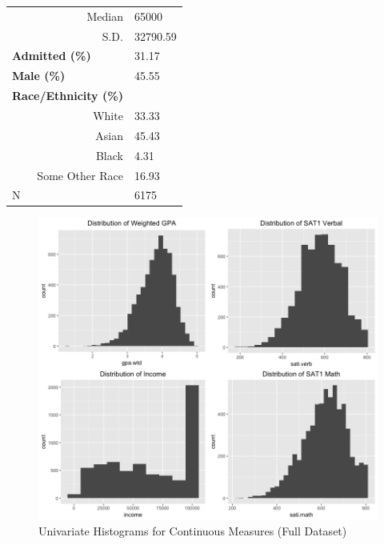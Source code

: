 \documentclass[titlepage]{article}   	%
\begin{document}
\begin{table}[]
\begin{tabular}{@{}rl@{}}
Median                                           & 65000    \\
S.D.                                             & 32790.59 \\
\multicolumn{1}{l}{\textbf{Admitted (\%)}}       & 31.17    \\
\multicolumn{1}{l}{\textbf{Male (\%)}}           & 45.55    \\
\multicolumn{1}{l}{\textbf{Race/Ethnicity (\%)}} &          \\
White                                            & 33.33    \\
Asian                                            & 45.43    \\
Black                                            & 4.31     \\
Some Other Race                                  & 16.93    \\
\multicolumn{1}{l}{N}                            & 6175     \\ \bottomrule
\end{tabular}
\end{table}

\begin{figure} [h]
\centering
\includegraphics[scale=.50]{univariate}
\caption{Univariate Histograms for Continuous Measures (Full Dataset)}
\end{figure}
\end{document}
